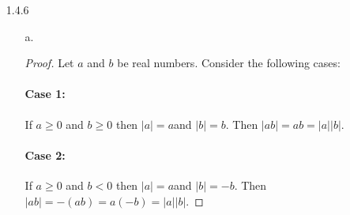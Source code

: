 \documentclass[11pt]{amsart}
\theoremstyle{definition}
\begin{document}
\begin{itemize}
\begin{itemize}
    \item[f.] \begin{proof}
        Assume that $x$ and $y$ are odd, so that $x=2k+1$ and $y=2j+1$ where $k,j\in\mathbb{Z}$. Then $3x-5y=3(2k+1)-5(2j+1)=6k-10j-2=2(3k-5j-1)=2l$ where $l=3k-5j-1$ is an integer. Thus we've proved that $3x-5y$ is even if $x$ and $y$ are odd.
    \end{proof}

    \item[g.] \begin{proof}
        Assume that $x$ and $y$ are odd, so that $x=2k+1$ and $y=2j+1$ where $k,j\in\mathbb{Z}$. Then $xy=(2k+1)(2j+1)=4kj+2k+2j+1=2(kj+k+j)+1=2l+1$ where $l=kj+k+j$ is an integer. Thus we've proved that $xy$ is odd if $x$ and $y$ are odd.
    \end{proof}

    \item[h.] \begin{proof}
        Assume that $x$ is even and $y$ is odd, so that $x=2k$ and $y=2j+1$ where $k,j\in\mathbb{Z}$. Then $x+y=2k+2j+1=2(k+j)+1=2l+1$ where $l=k+j$ is an integer. Thus we've proved that $x+y$ is odd if $x$ is even and $y$ is odd.
    \end{proof}

    \item[i.]\begin{proof}
        Without loss of generality, assume $x$ is even and $y$ and $z$ are odd such that $x=2k$, $y=2j+1$, and $z=2l+1$ where $x,y,z\in\mathbb{Z}$. Then, the sum of $x$, $y$, and $z$, $x+y+z=2k+2j+1+2l+1=2k+2j+2l+2=2(k+j+l+1)=2h$ where $h=k+j+l+1$ is an integer. Thus we've proved that the sum of $x$, $y$, and $z$ is even if exactly one is even.
    \end{proof}

\end{itemize}

\item[1.4.6]
\begin{itemize}
    \item[a.] \begin{proof}
        Let $a$ and $b$ be real numbers. Consider the following cases:
        \paragraph{Case 1:}
            If $a\ge 0$ and $b\ge 0$ then $|a|=a$and $|b|=b$. Then $|ab|=ab=|a||b|$.
        \paragraph{Case 2:}
            If $a\ge 0$ and $b< 0$ then $|a|=a$and $|b|=-b$. Then $|ab|=-(ab)=a(-b)=|a||b|$.

\end{proof}
\end{itemize}
\end{itemize}
\end{document}
